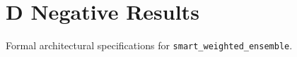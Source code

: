 \section{D Negative Results}

Formal architectural specifications for \texttt{smart_weighted_ensemble}.
